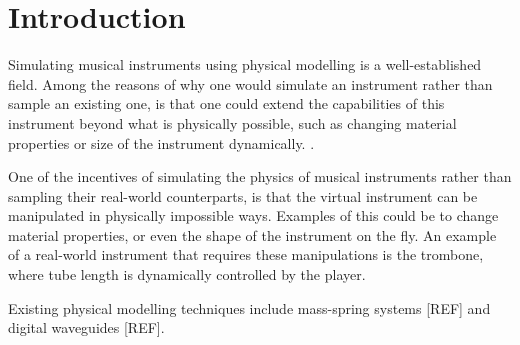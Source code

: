 \section{Introduction}

Simulating musical instruments using physical modelling is a well-established field. Among the reasons of why one would simulate an instrument rather than sample an existing one, is that one could extend the capabilities of this instrument beyond what is physically possible, such as changing material properties or size of the instrument dynamically. .



One of the incentives of simulating the physics of musical instruments rather than sampling their real-world counterparts, is that the virtual instrument can be manipulated in physically impossible ways.  \SWcomment[Will do!] Examples of this could be to change material properties, or even the shape of the instrument on the fly. An example of a real-world instrument that requires these manipulations is the trombone, where tube length is dynamically controlled by the player.


Existing physical modelling techniques include mass-spring systems [REF] and digital waveguides [REF]. 



